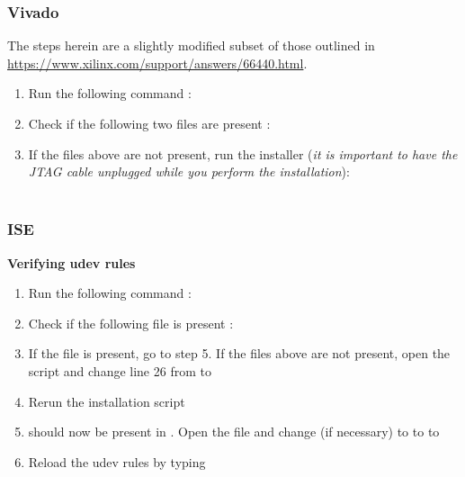 \subsubsection{Vivado}
\begin{flushleft}
The steps herein are a slightly modified subset of those outlined in \url{https://www.xilinx.com/support/answers/66440.html}.
\end{flushleft}
\begin{enumerate}
\item Run the following command : 
\item Check if the following two files are present : 
\item If the files above are not present, run the installer (\textit{it is important to have the JTAG cable unplugged while you perform the installation}):\\
	 \\
\end{enumerate}

\subsubsection{ISE}
\textbf{Verifying udev rules}
\begin{enumerate}
\item Run the following command : 
\item Check if the following file is present : 
\item If the file is present, go to step 5. If the files above are not present, open the  script and change line 26 from  to 
\item Rerun the  installation script
\item {} should now be present in . Open the file and change (if necessary)\newline
{} to \newline
{} to \newline
{} to 
\item Reload the udev rules by typing 
\end{enumerate}
